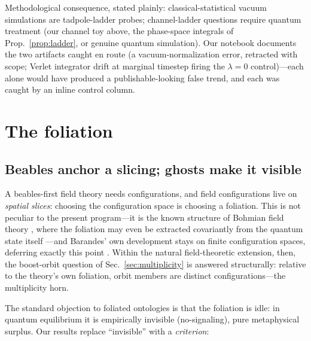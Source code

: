 \documentclass[11pt]{article}
\theoremstyle{definition}
\theoremstyle{remark}
\begin{document}
Methodological consequence, stated plainly: classical-statistical
vacuum simulations are tadpole-ladder probes; channel-ladder
questions require quantum treatment (our channel toy above, the
phase-space integrals of Prop.~\ref{prop:ladder}, or genuine quantum
simulation). Our notebook documents the two artifacts caught en route
(a vacuum-normalization error, retracted with scope; Verlet
integrator drift at marginal timestep firing the $\lambda=0$
control)---each alone would have
produced a publishable-looking false trend, and each was caught by an
inline control column.

\section{The foliation}
\label{sec:foliation}

\subsection{Beables anchor a slicing; ghosts make it visible}

A beables-first field theory needs configurations, and field
configurations live on \emph{spatial slices}: choosing the
configuration space is choosing a foliation. This is not peculiar to
the present program---it is the known structure of Bohmian field
theory \cite{HypersurfaceBD}, where the foliation may even be
extracted covariantly from the quantum state itself \cite{DGNSZ2014}
---and Barandes' own development stays on finite configuration
spaces, deferring exactly this point \cite{Barandes2025}. Within the
natural field-theoretic extension, then, the boost-orbit question of
Sec.~\ref{sec:multiplicity} is answered structurally: relative to the
theory's own foliation, orbit members are distinct
configurations---the multiplicity horn.

The standard objection to foliated ontologies is that the foliation
is idle: in quantum equilibrium it is empirically invisible
(no-signaling), pure metaphysical surplus. Our results replace
``invisible'' with a \emph{criterion}:
\end{document}
